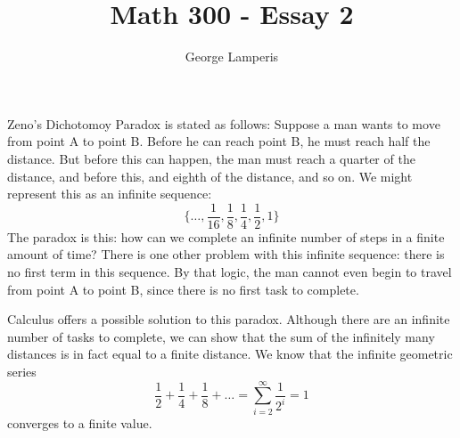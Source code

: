 \documentclass[12pt]{article}
\title{Math 300 - Essay 2}
\author{George Lamperis}
\date{}
\theoremstyle{mystyle}
\begin{document}
\maketitle

Zeno's Dichotomoy Paradox is stated as follows: Suppose a man wants to move from
point A to point B. Before he can reach point B, he must reach half the
distance. But before this can happen, the man must reach a quarter of the
distance, and before this, and eighth of the distance, and so on. We might
represent this as an infinite sequence:
$$ 
\{ \ldots, \frac{1}{16}, \frac{1}{8}, \frac{1}{4}, \frac{1}{2}, 1 \} 
$$
The paradox is this: how can we complete an infinite number of steps in a finite
amount of time? There is one other problem with this infinite sequence: there is
no first term in this sequence. By that logic, the man cannot even begin to
travel from point A to point B, since there is no first task to complete.

Calculus offers a possible solution to this paradox. Although there are an
infinite number of tasks to complete, we can show that the sum of the infinitely
many distances is in fact equal to a finite distance. We know that the infinite
geometric series 
$$ 
\frac{1}{2} + \frac{1}{4} + \frac{1}{8} + \ldots = \sum_{i = 2}^{\infty} \frac{1}{2^i} = 1 
$$
converges to a finite value. 
\end{document}
